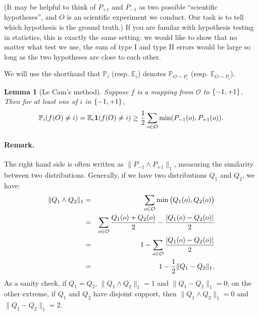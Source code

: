 \documentclass{article}
\newtheorem{lemma}{Lemma}
\newtheorem{definition}{Definition}
\newcommand{\EE}{\mathbb{E}}
\newcommand{\PP}{\mathbb{P}}
\newcommand{\Ocal}{\mathcal{O}}
\newcommand{\defeq}{\triangleq}
\newcommand*{\one}{{\bf 1}}
\begin{document}
(It may be helpful to think of $P_{+1}$ and $P_{-1}$ as two possible ``scientific hypotheses'', and $O$ is an scientific experiment we conduct. Our task is to tell which hypothesis is the ground truth.) If you are familar with hypothesis testing in statistics, this is exactly the same setting: we would like to show that no matter what test we use, the sum of type I and type II errors would be large so long as the two hypotheses are close to each other.


We will use the shorthand that $\PP_i$ (resp. $\EE_i$) denotes $\PP_{O \sim P_i}$ (resp. $\EE_{O \sim P_i}$).


\begin{lemma}[Le Cam's method]
Suppose $f$ is a mapping from $\Ocal$ to $\cbr{-1,+1}$. Then for at least one of
$i$ in $\cbr{-1,+1}$,
\[ \PP_i(f(O) \neq i) = \EE_i \one(f(O) \neq i) \geq \frac12\sum_{o \in \Ocal} \min(P_{-1}(o), P_{+1}(o)). \]
\label{lem:lecam}
\end{lemma}

\paragraph{Remark.} The right hand side is often written as
$\| P_{-1} \wedge P_{+1} \|_1$, measuring the similarity between two distributions. Generally, if we have two distributions $Q_1$ and $Q_2$,
we have:
\begin{eqnarray*}
  \| Q_1 \wedge Q_2 \|_1 &=& \sum_{o \in \Ocal} \min\del{Q_1(o), Q_2(o)} \\
  &=& \sum_{o \in \Ocal} \frac{Q_1(o) + Q_2(o)}{2} - \frac{|Q_1(o) - Q_2(o)|}{2} \\
  &=& 1 - \sum_{o \in \Ocal} \frac{|Q_1(o) - Q_2(o)|}{2} \\
  &=& 1 - \frac12 \| Q_1 - Q_2 \|_1.
\end{eqnarray*}
As a sanity check, if $Q_1 = Q_2$, $\| Q_1 \wedge Q_2 \|_1 = 1$ and $\| Q_1 - Q_2 \|_1 = 0$;
on the other extreme, if $Q_1$ and $Q_2$ have disjoint support, then $\| Q_1 \wedge Q_2 \|_1 = 0$ and $\| Q_1 - Q_2 \|_1 = 2$.
\end{document}
